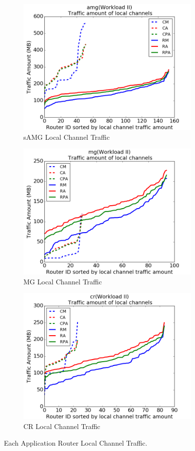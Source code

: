 \documentclass[conference,compsoc]{IEEEtran}
\begin{document}
\begin{figure}[t!]
    \centering
    \begin{subfigure}[t]{0.32\textwidth}
        \centering
        \includegraphics[height=1.5 in]{syn-wkld/amg10/lc-traffic}
        \caption{sAMG Local Channel Traffic}
        \label{fig:syn-samg-lc-traffic}
    \end{subfigure}%
    \hspace{1em}%
    \begin{subfigure}[t]{0.32\textwidth}
        \centering
        \includegraphics[height=1.5 in]{syn-wkld/mg/lc-traffic}
        \caption{MG Local Channel Traffic}
        \label{fig:syn-mg-lc-traffic}
    \end{subfigure}%
    \begin{subfigure}[t]{0.32\textwidth}
        \centering
        \includegraphics[height=1.5 in]{syn-wkld/cr/lc-traffic}
        \caption{CR Local Channel Traffic}
        \label{fig:syn-cr-lc-traffic}
    \end{subfigure}%
   \caption{Each Application Router Local Channel Traffic.  }
   \label{fig:syn-3app-lc-traffic}
\end{figure}
\end{document}
